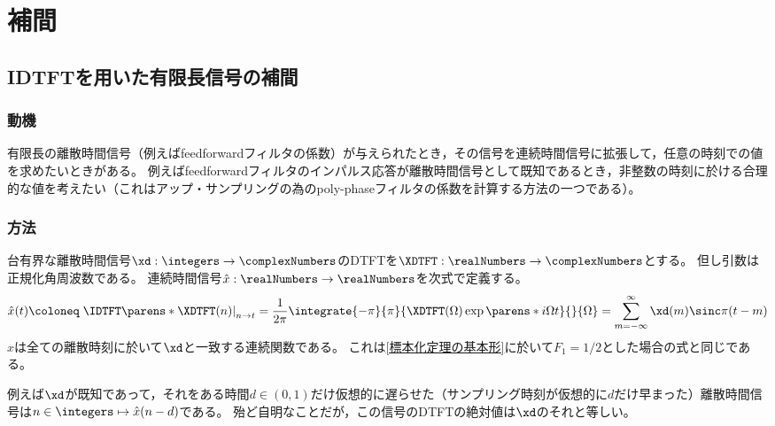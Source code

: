 \chapter{補間}
    \section{IDTFTを用いた有限長信号の補間}
        \label{IDTFT を用いた有限長信号の補間}
        \subsection{動機}
            有限長の離散時間信号（例えばfeedforwardフィルタの係数）が与えられたとき，その信号を連続時間信号に拡張して，任意の時刻での値を求めたいときがある。
            例えばfeedforwardフィルタのインパルス応答が離散時間信号として既知であるとき，非整数の時刻に於ける合理的な値を考えたい（これはアップ・サンプリングの為のpoly-phaseフィルタの係数を計算する方法の一つである）。
        \subsection{方法}
            \label{IDTFT を用いた有限長信号の補間>方法}
            台有界な離散時間信号$\xd:\integers\to\complexNumbers$のDTFTを$\XDTFT:\realNumbers\to\complexNumbers$とする。
            但し引数は正規化角周波数である。
            連続時間信号$\hat{x}:\realNumbers\to\realNumbers$を次式で定義する。
            \[ \hat{x}(t)\coloneq\left.\IDTFT\parens*{\XDTFT}(n)\right|_{n\to t} = \frac{1}{2\pi}\integrate{-\pi}{\pi}{\XDTFT(\Omega)\exp\parens*{i\Omega t}}{}{\Omega} = \sum_{m=-\infty}^\infty \xd(m)\sinc\pi(t-m) \]
            $\hat{x}$は全ての離散時刻に於いて$\xd$と一致する連続関数である。
            これは\ref{標本化定理の基本形}に於いて$F_1=1/2$とした場合の式と同じである。
            \par
            例えば$\xd$が既知であって，それをある時間$d\in(0,1)$だけ仮想的に遅らせた（サンプリング時刻が仮想的に$d$だけ早まった）離散時間信号は$n\in\integers\mapsto\hat{x}(n-d)$である。
            殆ど自明なことだが，この信号のDTFTの絶対値は$\xd$のそれと等しい。
